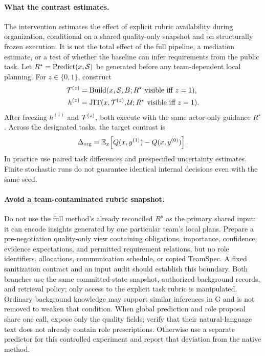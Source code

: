 \paragraph{What the contrast estimates.}
The intervention estimates the effect of explicit rubric availability during organization, conditional on a shared quality-only snapshot and on structurally frozen execution. It is not the total effect of the full pipeline, a mediation estimate, or a test of whether the baseline can infer requirements from the public task. Let $R^{\star}=\operatorname{Predict}(x,\mathcal{S})$ be generated before any team-dependent local planning. For $z\in\{0,1\}$, construct
\begin{align}
\mathcal{T}^{(z)}&=\operatorname{Build}(x,\mathcal{S},B;R^{\star}\text{ visible iff }z=1),\nonumber\\
h^{(z)}&=\operatorname{JIT}(x,\mathcal{T}^{(z)},\mathcal U;R^{\star}\text{ visible iff }z=1).
\end{align}
After freezing $h^{(z)}$ and $\mathcal{T}^{(z)}$, both execute with the same actor-only guidance $R^{\star}$. Across the designated tasks, the target contrast is
\begin{equation}
\Delta_{\rm org}=\mathbb E_x\!\left[Q(x,y^{(1)})-Q(x,y^{(0)})\right].
\end{equation}
In practice use paired task differences and prespecified uncertainty estimates. Finite stochastic runs do not guarantee identical internal decisions even with the same seed.

\paragraph{Avoid a team-contaminated rubric snapshot.}
Do not use the full method's already reconciled $R^p$ as the primary shared input: it can encode insights generated by one particular team's local plans. Prepare a pre-negotiation quality-only view containing obligations, importance, confidence, evidence expectations, and permitted requirement relations, but no role identifiers, allocations, communication schedule, or copied TeamSpec. A fixed sanitization contract and an input audit should establish this boundary. Both branches use the same committed-state snapshot, authorized background records, and retrieval policy; only access to the explicit task rubric is manipulated. Ordinary background knowledge may support similar inferences in G and is not removed to weaken that condition. When global prediction and role proposal share one call, expose only the quality fields; verify that their natural-language text does not already contain role prescriptions. Otherwise use a separate predictor for this controlled experiment and report that deviation from the native method.

